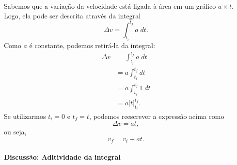 Sabemos que a variação da velocidade está ligada à área em um gráfico $a \times t$. Logo, ela pode ser descrita através da integral
\begin{equation}
    \Delta v = \int_{t_i}^{t_f} a \; dt.
\end{equation}
%
Como $a$ é constante, podemos retirá-la da integral:
\begin{align}
    \Delta v &= \int_{t_i}^{t_f} a \; dt \\
    &= a\int_{t_i}^{t_f} dt \\
    &= a\int_{t_i}^{t_f} 1 \;dt \\
    &= a\big[t\big]_{t_i}^{t_f}.
\end{align}
%
Se utilizarmos $t_i = 0$ e $t_f = t$, podemos reescrever a expressão acima como
\begin{equation}
    \Delta v = at,
\end{equation}
%
ou seja,
\begin{equation}
    v_f = v_i + at.
\end{equation}

\paragraph{Discussão: Aditividade da integral}

